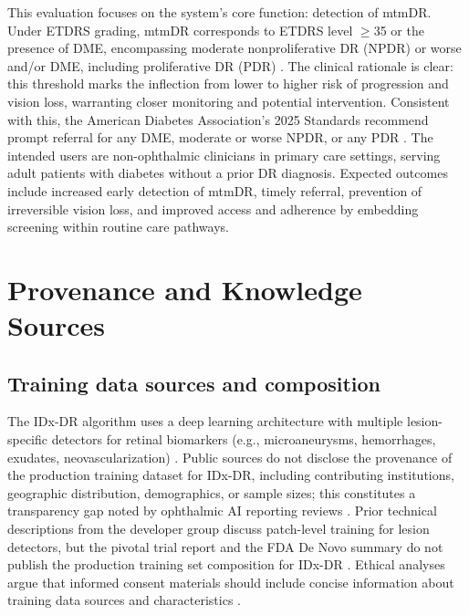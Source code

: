 \documentclass[sigconf]{acmart}
\begin{document}
This evaluation focuses on the system’s core function: detection of mtmDR. Under ETDRS grading, mtmDR corresponds to ETDRS level $\geq$35 or the presence of DME, encompassing moderate nonproliferative DR (NPDR) or worse and/or DME, including proliferative DR (PDR) \citep{ETDRS1991Report12}. The clinical rationale is clear: this threshold marks the inflection from lower to higher risk of progression and vision loss, warranting closer monitoring and potential intervention. Consistent with this, the American Diabetes Association’s 2025 Standards recommend prompt referral for any DME, moderate or worse NPDR, or any PDR \citep{ADA2025S12}. The intended users are non-ophthalmic clinicians in primary care settings, serving adult patients with diabetes without a prior DR diagnosis. Expected outcomes include increased early detection of mtmDR, timely referral, prevention of irreversible vision loss, and improved access and adherence by embedding screening within routine care pathways.

\section{Provenance and Knowledge Sources}

\subsection{Training data sources and composition}
The IDx\mbox{-}DR algorithm uses a deep learning architecture with multiple lesion\mbox{-}specific detectors for retinal biomarkers (e.g., microaneurysms, hemorrhages, exudates, neovascularization) \citep{Abramoff2018Pivotal}. Public sources do not disclose the provenance of the production training dataset for IDx\mbox{-}DR, including contributing institutions, geographic distribution, demographics, or sample sizes; this constitutes a transparency gap noted by ophthalmic AI reporting reviews \citep{Chen2024Transparency}. Prior technical descriptions from the developer group discuss patch\mbox{-}level training for lesion detectors, but the pivotal trial report and the FDA De Novo summary do not publish the production training set composition for IDx\mbox{-}DR \citep{Abramoff2018Pivotal,FDA2018DEN180001}. Ethical analyses argue that informed consent materials should include concise information about training data sources and characteristics \citep{Ursin2021InformedConsent}.
\end{document}
